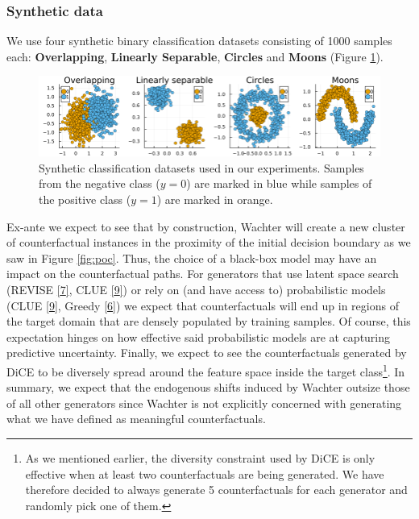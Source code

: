 \documentclass[conference,final,]{IEEEtran}
\theoremstyle{definition}
\theoremstyle{definition}
\theoremstyle{definition}
\theoremstyle{definition}
\theoremstyle{remark}
\begin{document}
\hypertarget{synthetic-data}{%
\subsubsection{Synthetic data}\label{synthetic-data}}

We use four synthetic binary classification datasets consisting of 1000 samples each: \textbf{Overlapping}, \textbf{Linearly Separable}, \textbf{Circles} and \textbf{Moons} (Figure \ref{fig:synthetic-data}).

\begin{figure}

{\centering \includegraphics[width=0.9\linewidth]{www/synthetic_data} 

}

\caption{Synthetic classification datasets used in our experiments. Samples from the negative class ($y=0$) are marked in blue while samples of the positive class ($y=1$) are marked in orange.}\label{fig:synthetic-data}
\end{figure}

Ex-ante we expect to see that by construction, Wachter will create a new cluster of counterfactual instances in the proximity of the initial decision boundary as we saw in Figure \ref{fig:poc}. Thus, the choice of a black-box model may have an impact on the counterfactual paths. For generators that use latent space search (REVISE \protect\hyperlink{ref-joshi2019realistic}{{[}7{]}}, CLUE \protect\hyperlink{ref-antoran2020getting}{{[}9{]}}) or rely on (and have access to) probabilistic models (CLUE \protect\hyperlink{ref-antoran2020getting}{{[}9{]}}, Greedy \protect\hyperlink{ref-schut2021generating}{{[}6{]}}) we expect that counterfactuals will end up in regions of the target domain that are densely populated by training samples. Of course, this expectation hinges on how effective said probabilistic models are at capturing predictive uncertainty. Finally, we expect to see the counterfactuals generated by DiCE to be diversely spread around the feature space inside the target class\footnote{As we mentioned earlier, the diversity constraint used by DiCE is only effective when at least two counterfactuals are being generated. We have therefore decided to always generate 5 counterfactuals for each generator and randomly pick one of them.}. In summary, we expect that the endogenous shifts induced by Wachter outsize those of all other generators since Wachter is not explicitly concerned with generating what we have defined as meaningful counterfactuals.
\end{document}
